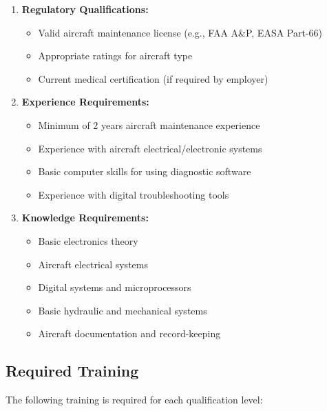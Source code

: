 \documentclass[12pt,a4paper,twoside,openright]{book}
\begin{document}
\begin{enumerate}
    \item \textbf{Regulatory Qualifications:}
    \begin{itemize}
        \item Valid aircraft maintenance license (e.g., FAA A\&P, EASA Part-66)
        \item Appropriate ratings for aircraft type
        \item Current medical certification (if required by employer)
    \end{itemize}
    
    \item \textbf{Experience Requirements:}
    \begin{itemize}
        \item Minimum of 2 years aircraft maintenance experience
        \item Experience with aircraft electrical/electronic systems
        \item Basic computer skills for using diagnostic software
        \item Experience with digital troubleshooting tools
    \end{itemize}
    
    \item \textbf{Knowledge Requirements:}
    \begin{itemize}
        \item Basic electronics theory
        \item Aircraft electrical systems
        \item Digital systems and microprocessors
        \item Basic hydraulic and mechanical systems
        \item Aircraft documentation and record-keeping
    \end{itemize}
\end{enumerate}

\subsection{Required Training}

The following training is required for each qualification level:
\end{document}
